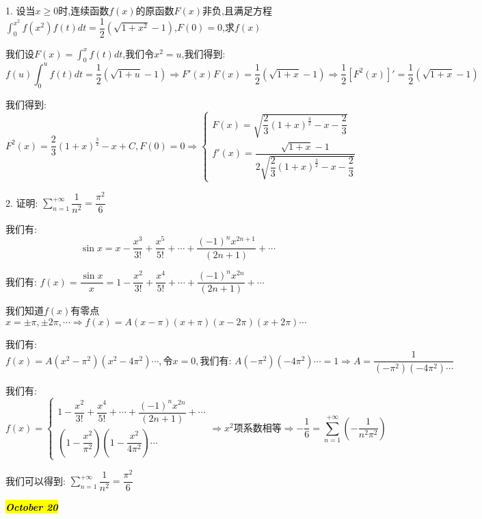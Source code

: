 1. 设当$x\geq 0$时,连续函数$f(x)$的原函数$F(x)$非负,且满足方程$\int_{0}^{x^2}f(x^2)f(t)dt=\dfrac{1}{2}(\sqrt{1+x^2}-1)$,$F(0)=0$,求$f(x)$
\begin{solution}

	我们设$F(x)=\int_{0}^{x}f(t)dt$,我们令$x^2=u$,我们得到:  
	$$f(u)\int_{0}^{u}f(t)dt=\dfrac{1}{2}(\sqrt{1+u}-1)\Rightarrow F'(x)F(x)=\dfrac{1}{2}(\sqrt{1+x}-1)\Rightarrow \dfrac{1}{2}[F^2(x)]'=\dfrac{1}{2}(\sqrt{1+x}-1)$$
	
	我们得到:  
	$$F^2(x)=\dfrac{2}{3}(1+x)^{\frac{3}{2}}-x+C,F(0)=0\Rightarrow \left\lbrace
	\begin{array}{l}
		F(x)=\sqrt{\dfrac{2}{3}(1+x)^{\frac{3}{2}}-x-\dfrac{2}{3}}\\
		f'(x)=\dfrac{\sqrt{1+x}-1}{2\sqrt{\dfrac{2}{3}(1+x)^{\frac{3}{2}}-x-\dfrac{2}{3}}}
	\end{array}
	\right. $$
\end{solution}

2. 证明:  $\sum\limits_{n=1}^{+\infty}\dfrac{1}{n^2}=\dfrac{\pi^2}{6}$
\begin{solution}

	我们有:  
	$$\sin x=x-\dfrac{x^3}{3!}+\dfrac{x^5}{5!}+\cdots+\dfrac{(-1)^{n}x^{2n+1}}{(2n+1)}+\cdots$$
	
	我们有:  $f(x)=\dfrac{\sin x}{x}=1-\dfrac{x^2}{3!}+\dfrac{x^4}{5!}+\cdots+\dfrac{(-1)^{n}x^{2n}}{(2n+1)}+\cdots$
	
	我们知道$f(x)$有零点$x=\pm\pi,\pm 2\pi,\cdots\Rightarrow f(x)=A(x-\pi)(x+\pi)(x-2\pi)(x+2\pi)\cdots$
	
	
	我们有:  
	$$f(x)=A(x^2-\pi^2)(x^2-4\pi^2)\cdots,\text{令}x=0,\text{我们有:  }A(-\pi^2)(-4\pi^2)\cdots=1\Rightarrow A=\dfrac{1}{(-\pi^2)(-4\pi^2)\cdots}$$
	
	我们有:  $$f(x)=\left\lbrace
	\begin{array}{l}
		1-\dfrac{x^2}{3!}+\dfrac{x^4}{5!}+\cdots+\dfrac{(-1)^{n}x^{2n}}{(2n+1)}+\cdots\\
		(1-\dfrac{x^2}{\pi^2})(1-\dfrac{x^2}{4\pi^2})\cdots
	\end{array}
	\right. \Rightarrow x^2\text{项系数相等}\Rightarrow -\dfrac{1}{6}=\sum\limits_{n=1}^{+\infty}(-\dfrac{1}{n^2\pi^2})$$
	
	我们可以得到:  $\sum\limits_{n=1}^{+\infty}\dfrac{1}{n^2}=\dfrac{\pi^2}{6}$
\end{solution}

\hl{\textbf{\textit{October 20}}}

